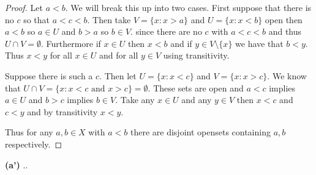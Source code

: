 \documentclass[11pt]{amsart}
\theoremstyle{definition}
\numberwithin{theorem}{section}
\numberwithin{definition}{section}
\numberwithin{equation}{section}
\begin{document}
\begin{proof}
	Let $a <b$. We will break this up into two cases. First suppose that there is no $c$ so that $a < c < b$.
	Then take $V = \{x: x > a\}$ and $U =\{x : x < b\}$ open then $a < b$ so $a \in U$ and $b >a$ so $b \in V$.
	since there are no $c$ with $a <c < b$ and thus $U \cap V = \emptyset$. Furthermore if $x \in U$ then $x < b$ and if $y \in V \setminus\{x\}$ we have that $b < y$. Thus $x < y$ for all $x \in U$ and for all $y \in V$ using transitivity.

	  Suppose there is such a $c$. Then let $U = \{x: x < c\}$ and $V = \{x:x >c\}.$ We know that $U \cap V = \{x: x <c \text{ and } x > c \} = \emptyset.$ These sets are open and $a <c$ implies $a \in U$ and $b > c$ implies $b \in V$. Take any $x \in U$ and any $y \in V$ then $x < c$ and $ c < y$ and by transitivity $x < y$.

	  Thus for any $a,b \in X$ with $a< b$ there are disjoint opensets containing $a,b$ respectively.




\end{proof}
\noindent \textbf{(a')} ..
\end{document}
